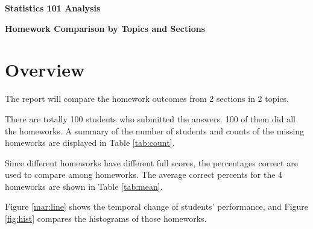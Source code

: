 \documentclass[12pt,nohyper]{tufte-handout}\usepackage[]{graphicx}\usepackage[]{color}
\begin{document}
\centerline{\Large\bf Statistics 101 Analysis}
\centerline{\bf Homework Comparison by Topics and Sections}
\centerline{\bf }


\section{Overview}

The report will compare the homework outcomes from 
2 sections in 2 topics.

There are totally 100 students 
who submitted the answers. 
100
of them did all the homeworks. A summary of the number of students
and counts of the missing homeworks are displayed in Table \ref{tab:count}.

Since different homeworks have different full scores, 
the percentages correct are used to compare among homeworks.
The average correct percents for the 4 homeworks are 
shown in Table \ref{tab:mean}.

Figure \ref{mar:line} shows the temporal change of students' performance,
and Figure \ref{fig:hist} compares the histograms of those homeworks.
\end{document}
